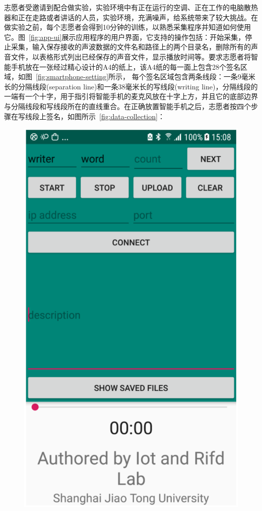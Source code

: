 志愿者受邀请到配合做实验，实验环境中有正在运行的空调、正在工作的电脑散热器和正在走路或者讲话的人员，实验环境，充满噪声，给系统带来了较大挑战。在做实验之前，每个志愿者会得到10分钟的训练，以熟悉采集程序并知道如何使用它。图~\ref{fig:app-ui}展示应用程序的用户界面，它支持的操作包括：开始采集，停止采集，输入保存接收的声波数据的文件名和路径上的两个目录名，删除所有的声音文件，以表格形式列出已经保存的声音文件，显示播放时间等。要求志愿者将智能手机放在一张经过精心设计的A4的纸上，该A4纸的每一面上包含28个签名区域，如图~\ref{fig:smartphone-setting}所示，
每个签名区域包含两条线段：一条9毫米长的分隔线段(separation line)和一条38毫米长的写线段(writing line)，分隔线段的一端有一个十字，用于指引将智能手机的麦克风放在十字上方，并且它的底部边界与分隔线段和写线段所在的直线重合。在正确放置智能手机之后，志愿者按四个步骤在写线段上签名，如图所示~\ref{fig:data-collection}：
\begin{figure}
  \centering
  \begin{minipage}[t]{0.32\textwidth}
    \centering
    \includegraphics[width=\textwidth]{figure/app-ui.pdf}

\end{minipage}
\end{figure}
